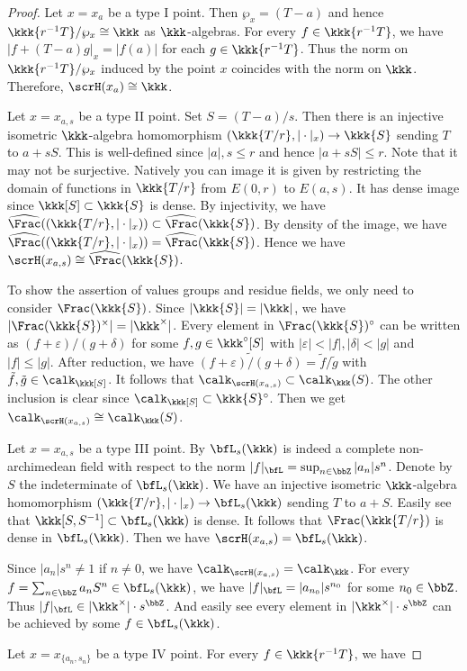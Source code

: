 \begin{proof}
	Let \(x=x_a\) be a type I point.
	Then \(\wp_x = (T - a)\) and hence \(\kkk\{r^{-1}T\}/\wp_x \cong \kkk\) as \(\kkk\)-algebras.
	For every \(f \in \kkk\{r^{-1}T\}\), we have \(|f+(T - a)g|_x = |f(a)|\) for each \(g \in \kkk\{r^{-1}T\}\).
	Thus the norm on \(\kkk\{r^{-1}T\}/\wp_x\) induced by the point \(x\) coincides with the norm on \(\kkk\).
	Therefore, \(\scrH(x_a) \cong \kkk\).

	Let \(x = x_{a,s}\) be a type II point.
	Set \(S = (T - a)/s\).
	Then there is an injective isometric \(\kkk\)-algebra homomorphism \((\kkk\{T/r\},|\cdot|_x) \to \kkk\{S\}\) sending \(T\) to \(a + sS\).
	This is well-defined since \(|a|,s \leq r\) and hence \(|a + sS| \leq r\).
	Note that it may not be surjective.
	Natively you can image it is given by restricting the domain of functions in \(\kkk\{T/r\}\) from \(E(0,r)\) to \(E(a,s)\).
	It has dense image since \(\kkk[S] \subset \kkk\{S\}\) is dense.
	By injectivity, we have \(\widehat{\Frac}((\kkk\{T/r\},|\cdot|_x)) \subset \widehat{\Frac}(\kkk\{S\})\).
	By density of the image, we have \(\widehat{\Frac}((\kkk\{T/r\},|\cdot|_x)) = \widehat{\Frac}(\kkk\{S\})\).
	Hence we have \(\scrH(x_{a,s}) \cong \widehat{\Frac}(\kkk\{S\})\).

	To show the assertion of values groups and residue fields, we only need to consider \(\Frac(\kkk\{S\})\).
	Since \(|\kkk\{S\}| = |\kkk|\), we have \(|\Frac(\kkk\{S\})^\times| = |\kkk^\times|\).
	Every element in \(\Frac(\kkk\{S\})^\circ\) can be written as \((f+\varepsilon)/(g+\delta)\) for some \(f,g \in \kkk^\circ[S]\) with \(|\varepsilon|<|f|, |\delta|<|g|\) and \(|f|\leq |g|\).
	After reduction, we have \(\widetilde{(f+\varepsilon)/(g+\delta)} = \tilde{f}/\tilde{g}\) with \(\tilde{f}, \tilde{g} \in \calk_\kkk[S]\).
	It follows that \(\calk_{\scrH(x_{a,s})} \subset \calk_\kkk(S)\).
	The other inclusion is clear since \(\calk_\kkk[S] \subset \kkk\{S\}^\circ\).
	Then we get \(\calk_{\scrH(x_{a,s})} \cong \calk_\kkk(S)\).

	Let \(x = x_{a,s}\) be a type III point.
	By  \(\bfL_{s}(\kkk)\) is indeed a complete non-archimedean field with respect to the norm \(|f|_{\bfL} = \sup_{n \in \bbZ} |a_n| s^n\).
	Denote by \(S\) the indeterminate of \(\bfL_{s}(\kkk)\).
	We have an injective isometric \(\kkk\)-algebra homomorphism \((\kkk\{T/r\},|\cdot|_x) \to \bfL_{s}(\kkk)\) sending \(T\) to \(a + S\).
	Easily see that \(\kkk[S,S^{-1}] \subset \bfL_{s}(\kkk)\) is dense.
	It follows that \(\Frac(\kkk\{T/r\})\) is dense in \(\bfL_{s}(\kkk)\).
	Then we have \(\scrH(x_{a,s}) = \bfL_{s}(\kkk)\).

	Since \(|a_n|s^n \neq 1\) if \(n \neq 0\), we have \(\calk_{\scrH(x_{a,s})} = \calk_\kkk\).
	For every \(f = \sum_{n\in \bbZ} a_n S^n \in \bfL_{s}(\kkk)\), we have \(|f|_{\bfL} = |a_{n_0}| s^{n_0}\) for some \(n_0 \in \bbZ\).
	Thus \(|f|_{\bfL} \in |\kkk^\times| \cdot s^\bbZ\).
	And easily see every element in \(|\kkk^\times| \cdot s^\bbZ\) can be achieved by some \(f \in \bfL_{s}(\kkk)\).

	Let \(x = x_{\{a_n,s_n\}}\) be a type IV point.
	For every \(f \in \kkk\{r^{-1}T\}\), we have

\end{proof}

